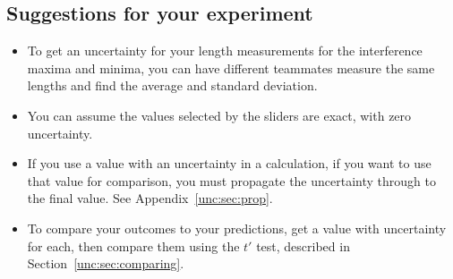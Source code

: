 \subsection{Suggestions for your experiment}

\begin{itemize}
	
	

	\item To get an uncertainty for your length measurements for the interference maxima and minima, you can have different teammates measure the same lengths and find the average and standard deviation.


	\item You can assume the values selected by the sliders are exact, with zero uncertainty.
	
	
	\item If you use a value with an uncertainty in a calculation, if you want to use that value for comparison, you must propagate the uncertainty through to the final value. See Appendix~\ref{unc:sec:prop}.
	
	\item To compare your outcomes to your predictions, get a value with uncertainty for each, then compare them using the $t'$ test, described in Section~\ref{unc:sec:comparing}.
\end{itemize}

